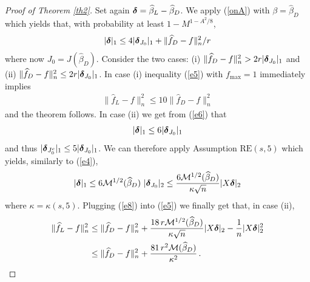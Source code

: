 \documentclass[dvips,aos]{imsart}
\numberwithin{equation}{section}
\theoremstyle{plain}
\def\wideth{\widehat}
\def\scm{{\cal M}}
\def\wh{\widehat}
\def\RE#1#2{$\text{RE}(#1,#2)$}
\newcommand{\bD}{\mbox{\boldmath$\delta$}}
\begin{document}
\begin{proof}[Proof of Theorem \ref{th2}] Set again $\bD=\wh\beta_L-\wh\beta_D$. We
apply (\ref{onA}) with $\beta=\wh\beta_D$ which yields that,
with probability at least $1-M^{1-A^2/8}$,
\begin{equation}\begin{split}\label{e6}
|\bD|_1 \le 4 |\bD_{J_0}|_1 + \| \wideth{f}_D -f \|_n^2 /r
\end{split}\end{equation}
where now $J_0=J(\wh \beta_D)$. Consider the two cases: (i) $\|
\wideth{f}_D -f \|_n^2
>2r|\bD_{J_0}|_1$ and (ii) $\| \wideth{f}_D -f \|_n^2
\le 2r|\bD_{J_0}|_1$. In case (i) inequality (\ref{e5}) with
$f_{\max}=1$ immediately implies
\begin{equation*}\begin{split}%
\| \wideth{f}_L -f \|_n^2\le 10\| \wideth{f}_D -f \|_n^2
\end{split}\end{equation*}
and the theorem follows. In case (ii) we get from (\ref{e6}) that
\begin{equation*}\begin{split}%
|\bD|_1 \le 6 |\bD_{J_0}|_1
\end{split}\end{equation*}
and thus $|\bD_{J_0^c}|_1 \le 5 |\bD_{J_0}|_1$. We can therefore
apply Assumption \RE s5 which yields, similarly to (\ref{e4}),
\begin{equation}\begin{split}\label{e8}
|\bD|_1 \le 6 \scm^{1/2}(\wh \beta_D)\ |\bD_{J_{0}}|_2\le \frac{6
\scm^{1/2}(\wh \beta_D)}{\kappa\sqrt{n}}|X \bD|_2
\end{split}\end{equation}
where $\kappa=\kappa(s,5)$. Plugging (\ref{e8}) into (\ref{e5}) we
finally get that, in case (ii),
\begin{equation}\begin{split}
\| \wideth f_L -f\|_n^2 &\le \| \wideth{f}_D -f \|_n^2 +
\frac{18\, r \scm^{1/2}(\wh \beta_D)}{\kappa\sqrt{n}}|X \bD|_2
- \frac{1}{n}|X \bD|^2_2\\
%
&\le\| \wideth{f}_D -f \|_n^2 +\frac{ 81\,r^2 \scm(\wh\beta_D)}
{\kappa^2}\,.
\end{split}
\end{equation}
\end{proof}



\end{document}
